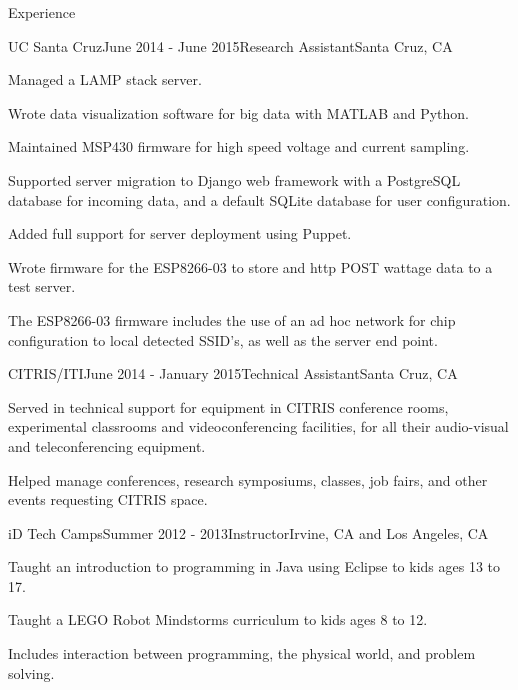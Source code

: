 \documentclass{resume} %
\begin{document}
\begin{rSection}{Experience}

\begin{rSubsection}{UC Santa Cruz}{June 2014 - June 2015}{Research Assistant}{Santa Cruz, CA}
\item Managed a LAMP stack server.
\item Wrote data visualization software for big data with MATLAB and Python.
\item Maintained MSP430 firmware for high speed voltage and current sampling.
\item Supported server migration to Django web framework with a PostgreSQL database for incoming data, and a default SQLite database for user configuration.
\item Added full support for server deployment using Puppet.
\item Wrote firmware for the ESP8266-03 to store and http POST wattage data to a test server.
\item The ESP8266-03 firmware includes the use of an ad hoc network for chip configuration to local detected SSID's, as well as the server end point.
\end{rSubsection}


\begin{rSubsection}{CITRIS/ITI}{June 2014 - January 2015}{Technical Assistant}{Santa Cruz, CA}
\item Served in technical support for equipment in CITRIS conference rooms, experimental classrooms and videoconferencing facilities, for all their audio-visual and teleconferencing equipment.
\item Helped manage conferences, research symposiums, classes, job fairs, and other events requesting CITRIS space.
\end{rSubsection}


\begin{rSubsection}{iD Tech Camps}{Summer 2012 - 2013}{Instructor}{Irvine, CA and Los Angeles, CA}
\item Taught an introduction to programming in Java using Eclipse to kids ages 13 to 17.
\item Taught a LEGO Robot Mindstorms curriculum to kids ages 8 to 12.
\item Includes interaction between programming, the physical world, and problem solving.
\end{rSubsection}

\end{rSection}
\end{document}

